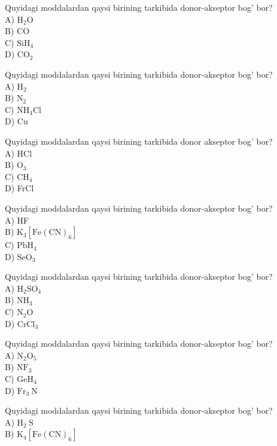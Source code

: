   \item Quyidagi moddalardan qaysi birining tarkibida donor-akseptor bog' bor?\\
A) $\mathrm{H}_{2} \mathrm{O}$\\
B) CO\\
C) $\mathrm{SiH}_{4}$\\
D) $\mathrm{CO}_{2}$
  \item Quyidagi moddalardan qaysi birining tarkibida donor-akseptor bog' bor?\\
A) $\mathrm{H}_{2}$\\
B) $\mathrm{N}_{2}$\\
C) $\mathrm{NH}_{4} \mathrm{Cl}$\\
D) Cu
  \item Quyidagi moddalardan qaysi birining tarkibida donor akseptor bog' bor?\\
A) HCl\\
B) $\mathrm{O}_{3}$\\
C) $\mathrm{CH}_{4}$\\
D) FrCl
  \item Quyidagi moddalardan qaysi birining tarkibida donor-akseptor bog' bor?\\
A) HF\\
B) $\mathrm{K}_{3}\left[\mathrm{Fe}(\mathrm{CN})_{6}\right]$\\
C) $\mathrm{PbH}_{4}$\\
D) $\mathrm{SeO}_{3}$
  \item Quyidagi moddalardan qaysi birining tarkibida donor-akseptor bog' bor?\\
A) $\mathrm{H}_{2} \mathrm{SO}_{4}$\\
B) $\mathrm{NH}_{3}$\\
C) $\mathrm{N}_{2} \mathrm{O}$\\
D) $\mathrm{CrCl}_{3}$
  \item Quyidagi moddalardan qaysi birining tarkibida donor-akseptor bog' bor?\\
A) $\mathrm{N}_{2} \mathrm{O}_{5}$\\
B) $\mathrm{NF}_{3}$\\
C) $\mathrm{GeH}_{4}$\\
D) $\mathrm{Fr}_{3} \mathrm{~N}$
  \item Quyidagi moddalardan qaysi birining tarkibida donor-akseptor bog' bor?\\
A) $\mathrm{H}_{2} \mathrm{~S}$\\
B) $\mathrm{K}_{4}\left[\mathrm{Fe}(\mathrm{CN})_{6}\right]$\\
